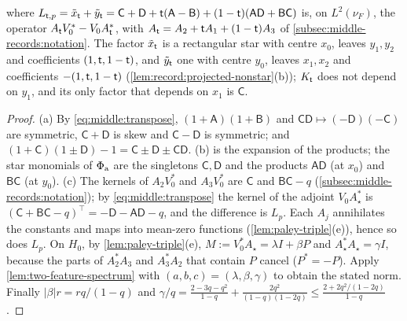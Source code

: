 \begin{lemma}
\begin{enumerate}[label=(\alph*)]
 where
 $L_{\mathsf t,p}=\tilde x_\mathsf t+\tilde y_\mathsf t=\mathsf C+\mathsf D+\mathsf t(\mathsf A-\mathsf B)
 +(1-\mathsf t)(\mathsf A\mathsf D+\mathsf B\mathsf C)$ is, on $L^2(\nu_F)$, the operator
 $A_\mathsf t V_0^*-V_0A_\mathsf t^*$, with $A_\mathsf t=A_2+\mathsf t A_1+(1-\mathsf t)A_3$ of
 \cref{subsec:middle-records:notation}. The factor $\tilde x_\mathsf t$ is a rectangular
 star with centre $x_0$, leaves $y_1,y_2$ and coefficients $(1,\mathsf t,1-\mathsf t)$, and
 $\tilde y_\mathsf t$ one with centre $y_0$, leaves $x_1,x_2$ and coefficients
 $-(1,\mathsf t,1-\mathsf t)$ (\cref{lem:record:projected-nonstar}(b)); $K_\mathsf t$ does not
 depend on $y_1$, and its only factor that depends on $x_1$ is $\mathsf C$.
\end{enumerate}
\end{lemma}

\begin{proof}
(a) By \eqref{eq:middle:transpose}, $(1+\mathsf A)(1+\mathsf B)$ and
$\mathsf C\mathsf D\mapsto(-\mathsf D)(-\mathsf C)$ are symmetric,
$\mathsf C+\mathsf D$ is skew and $\mathsf C-\mathsf D$ is symmetric; and
$(1+\mathsf C)(1\pm\mathsf D)-1=\mathsf C\pm\mathsf D\pm\mathsf C\mathsf D$.
(b) is the expansion of the products; the star monomials of $\Phi_{\rm a}$ are
the singletons $\mathsf C,\mathsf D$ and the products $\mathsf A\mathsf D$ (at $x_0$)
and $\mathsf B\mathsf C$ (at $y_0$).
(c) The kernels of $A_2V_0^*$ and $A_3V_0^*$ are $\mathsf C$ and
$\mathsf B\mathsf C-q$ (\cref{subsec:middle-records:notation}); by
\eqref{eq:middle:transpose} the kernel of the adjoint $V_0A_\star^*$ is
$(\mathsf C+\mathsf B\mathsf C-q)^\top=-\mathsf D-\mathsf A\mathsf D-q$, and the
difference is $L_p$. Each $A_j$ annihilates the constants and maps into
mean-zero functions (\cref{lem:paley-triple}(e)), hence so does $L_p$. On $H_0$,
by \cref{lem:paley-triple}(e), $M:=V_0^*A_\star=\lambda I+\beta P$ and
$A_\star^*A_\star=\gamma I$, because the parts of $A_2^*A_3$ and $A_3^*A_2$ that
contain $P$ cancel ($P^*=-P$). Apply \cref{lem:two-feature-spectrum} with
$(a,b,c)=(\lambda,\beta,\gamma)$ to obtain the stated norm. Finally
$|\beta|r=rq/(1-q)$ and
$\gamma/q=\frac{2-3q-q^2}{1-q}+\frac{2q^2}{(1-q)(1-2q)}\le\frac{2+2q^2/(1-2q)}{1-q}$.


\end{proof}
